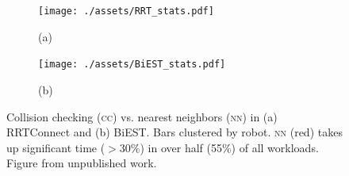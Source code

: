 \documentclass{article}
\begin{document}
\begin{figure}[t]
\centering
\begin{subfigure}{0.7\textwidth}
    \begin{minipage}[c]{.05\textwidth}
    \vspace{0.5cm}
        \caption*{(a)}
    \end{minipage}%
    \begin{minipage}[c]{.95\textwidth}
        \centering
        \texttt{[image: ./assets/RRT\_stats.pdf]}
    \end{minipage}
    \label{fig:cc_nn_rrtconnect}
    \vspace{-0.2cm}
\end{subfigure}

\begin{subfigure}{0.7\textwidth}
    \begin{minipage}[c]{.05\textwidth}
    \vspace{-1.7cm}
        \caption*{(b)}
    \end{minipage}%
    \begin{minipage}[c]{.95\textwidth}
        \centering
        \texttt{[image: ./assets/BiEST\_stats.pdf]}
    \end{minipage}
    \label{fig:cc_nn_biest}
\end{subfigure}
\caption{Collision checking (\textsc{cc}) vs. nearest neighbors (\textsc{nn}) in (a) RRTConnect and (b) BiEST. Bars clustered by robot. \textsc{nn} (red) takes up significant time ($>$30\%) in over half (55\%) of all workloads. Figure from unpublished work.}
\label{fig:cc_nn}
\end{figure}

\printbibliography
\end{document}
